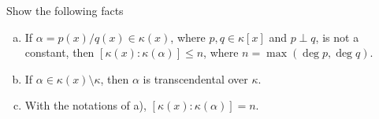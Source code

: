 \begin{probl} Show the following facts
    \begin{enumerate}[a),font=\upshape]
        \item If\/ $\alpha = p(x)/q(x)\in \kappa(x)$, where\/ $p, q \in \kappa[x]$ and\/ $p\perp q$, is not a constant, then\/ $[\kappa(x) : \kappa(\alpha)] \le n$, where $n=\max(\deg p, \deg q)$.
    
        \item If\/ $\alpha \in \kappa(x) \setminus \kappa$, then\/ $\alpha$ is transcendental over\/ $\kappa$.
    
        \item With the notations of\/ {\rm a)}, $[\kappa(x):\kappa(\alpha)]=n$.
    \end{enumerate}
\end{probl}


